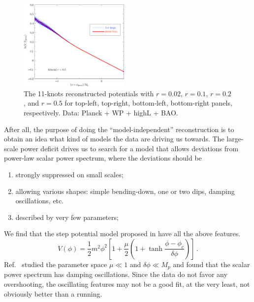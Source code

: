 \documentclass[a4paper,11pt]{article}
\def \halffigwidth{0.48\textwidth}
\begin{document}
\begin{figure}
  \includegraphics[width=\halffigwidth]{nobicep_spline0_p11_r0d5_potential_traj.pdf}
  \caption{The 11-knots reconstructed potentials with $r = 0.02$, $r=0.1$, $r=0.2$, and $r=0.5$ for top-left, top-right, bottom-left, bottom-right panels, respectively.  Data: Planck + WP + highL + BAO. \label{fig:traj_potential}}
\end{figure}

After all, the purpose of doing the ``model-independent'' reconstruction is to obtain an idea what kind of models the data are driving us towards. The large-scale power deficit drives us to search for a model that allows deviations from power-law scalar power spectrum, where the deviations should be
\begin{enumerate}
\item{strongly suppressed on small scales;}
\item{allowing various shapes: simple bending-down, one or two dips, damping oscillations, etc.}
\item{described by very few parameters;}
\end{enumerate}

We find that the step potential model proposed in \cite{Adams2001} have all the above features.
\begin{equation}
V(\phi) = \frac{1}{2}m^2\phi^2\left[1 + \frac{\mu}{2} (1 + \tanh{\frac{\phi - \phi_c}{\delta\phi}}) \right] \,. \label{eq:pot}
\end{equation}
Ref.~\cite{Adams2001} studied the parameter space $\mu \ll 1$ and $\delta\phi \ll M_p$ and found that the scalar power spectrum has damping oscillations. Since the data do not favor any overshooting, the oscillating features may not be a good fit,  at the very least, not obviously better than a running. 
\end{document}
